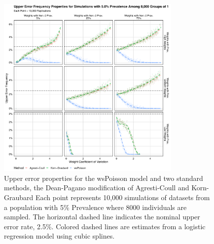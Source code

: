 \documentclass[AMA,STIX1COL]{WileyNJD-v2}
\begin{document}
\begin{figure}
\centering
\includegraphics[width=0.8\textwidth]{figures/perfect_upper_error_frequency_8000_groups_0_05_prev.pdf}
\caption{Upper error properties for the wsPoisson model and two standard methods, the Dean-Pagano modification of Agresti-Coull and Korn-Graubard
Each point represents 10,000 simulations of datasets from a population with 5\% Prevalence where 8000 individuals are sampled.
The horizontal dashed line indicates the nominal upper error rate, 2.5\%.
Colored dashed lines are estimates from a logistic regression model using cubic splines.}
\label{fig:perfect_upper_error_frequency_8000_groups_0_05_prev}
\end{figure}
\end{document}
